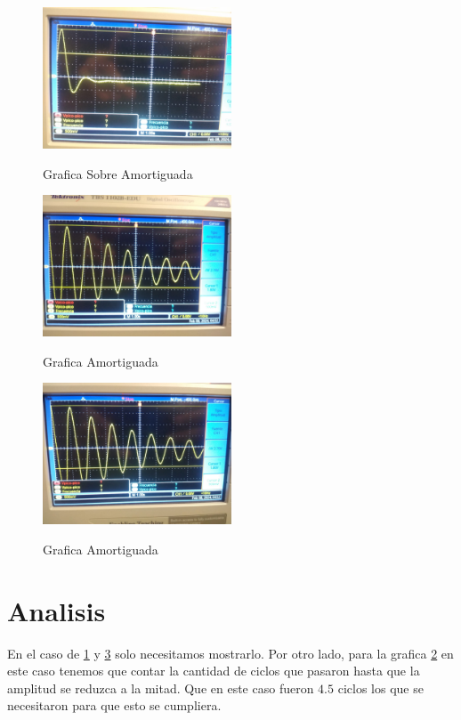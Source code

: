 \documentclass{report}
\begin{document}
\begin{figure}[H]
	\caption{Grafica Sobre Amortiguada}
	\centering
	\includegraphics[width=0.5\textwidth]{../Analisis/Graficas/actividad41.png}
	\label{graphics/actividad41}
\end{figure}
\begin{figure}[H]
	\caption{Grafica Amortiguada}
	\centering
	\includegraphics[width=0.5\textwidth]{../Analisis/Graficas/actividad42.png}
	\label{graphics/actividad42}
\end{figure}
\begin{figure}[H]
	\caption{Grafica Amortiguada}
	\centering
	\includegraphics[width=0.5\textwidth]{../Analisis/Graficas/actividad43.png}
	\label{graphics/actividad43}
\end{figure}

\section{Analisis}

En el caso de \ref{graphics/actividad41} y \ref{graphics/actividad43} solo necesitamos mostrarlo. Por otro lado, para la grafica \ref{graphics/actividad42} en este caso tenemos que contar la cantidad de ciclos que pasaron hasta que la amplitud se reduzca a la mitad. Que en este caso fueron $4.5$ ciclos los que se necesitaron para que esto se cumpliera.
\end{document}
